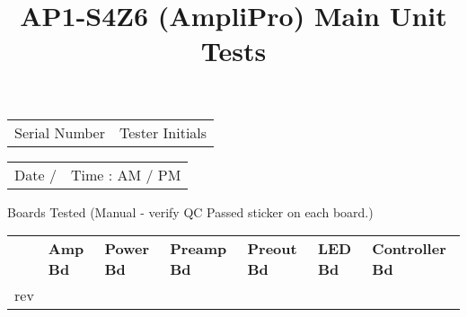\documentclass{article}
\title{AP1-S4Z6 (AmpliPro) Main Unit Tests}
\author{} %
\begin{document}
\maketitle            %
\thispagestyle{fancy} %

\begin{tabularx}{\textwidth}{XX}
  Serial Number \hrulefill & Tester Initials \hrulefill
\end{tabularx}

\bigskip
\begin{tabularx}{\textwidth}{XX}
  Date \hrulefill\hspace{0.2em} / \hrulefill &
    Time \hrulefill\hspace{0.2em} : \hrulefill\hspace{0.2em} AM / PM
\end{tabularx}

\bigskip
\begin{checklist}
  \item Boards Tested (Manual - verify QC Passed sticker on each board.)
\end{checklist}

{\renewcommand{\arraystretch}{1.5} %
\begin{tabularx}{\textwidth}{lXXXXXX}
  & \textbf{Amp Bd} & \textbf{Power Bd} & \textbf{Preamp Bd} &
    \textbf{Preout Bd} & \textbf{LED Bd} & \textbf{Controller Bd} \\
  \cline{2-7}
  rev & \multicolumn{1}{|c|}{} & \multicolumn{1}{|c|}{} & \multicolumn{1}{|c|}{}
    & \multicolumn{1}{|c|}{} & \multicolumn{1}{|c|}{} & \multicolumn{1}{|c|}{} \\
  \cline{2-7}
\end{tabularx}}
\end{document}
